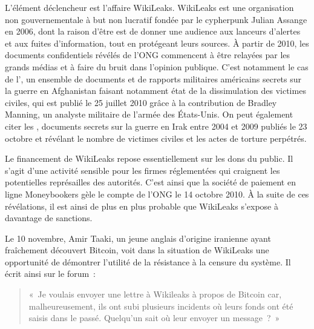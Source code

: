 L'élément déclencheur est l'affaire WikiLeaks. WikiLeaks est une organisation non gouvernementale à but non lucratif fondée par le cypherpunk Julian Assange en 2006, dont la raison d'être est de donner une audience aux lanceurs d'alertes et aux fuites d'information, tout en protégeant leurs sources. À partir de 2010, les documents confidentiels révélés de l'ONG commencent à être relayées par les grands médias et à faire du bruit dans l'opinion publique. C'est notamment le cas de l', un ensemble de documents et de rapports militaires américains secrets sur la guerre en Afghanistan faisant notamment état de la dissimulation des victimes civiles, qui est publié le 25 juillet 2010 grâce à la contribution de Bradley Manning, un analyste militaire de l'armée des États-Unis. On peut également citer les , documents secrets sur la guerre en Irak entre 2004 et 2009 publiés le 23 octobre et révélant le nombre de victimes civiles et les actes de torture perpétrés. %

Le financement de WikiLeaks repose essentiellement sur les dons du public. Il s'agit d'une activité sensible pour les firmes réglementées qui craignent les potentielles représailles des autorités. C'est ainsi que la société de paiement en ligne Moneybookers gèle le compte de l'ONG le 14 octobre 2010. À la suite de ces révélations, il est ainsi de plus en plus probable que WikiLeaks s'expose à davantage de sanctions.

Le 10 novembre, Amir Taaki, un jeune anglais d'origine iranienne ayant fraîchement découvert Bitcoin, voit dans la situation de WikiLeaks une opportunité de démontrer l'utilité de la résistance à la censure du système. Il écrit ainsi sur le forum~:

\begin{quote}
«~Je voulais envoyer une lettre à Wikileaks à propos de Bitcoin car, malheureusement, ils ont subi plusieurs incidents où leurs fonds ont été saisis dans le passé. Quelqu'un sait où leur envoyer un message~?~»
\end{quote}

